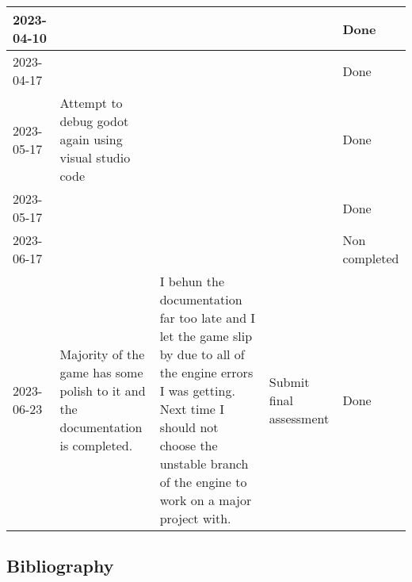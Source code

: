 \documentclass[12pt, DIV=calc]{scrartcl}
\newenvironment{alscape}[1]%
{%
    \begin{landscape}
}%
{%
    \end{landscape}
}
\begin{document}
\begin{alscape}{DIV=8}
\begin{xltabular}[c]{\textwidth}{|X|X|X|X|X|}
2023-04-10 & & & & Done \\ \hline

2023-04-17 & & & & Done \\ \hline

2023-05-17 & Attempt to debug godot again using visual studio code & & & Done \\ \hline

2023-05-17 &  & & & Done \\ \hline

2023-06-17 & & & & Non completed \\ \hline

2023-06-23 & Majority of the game has some polish to it and the documentation is completed.  & I behun the documentation far too late and I let the game slip by due to all of the engine errors I was getting. Next time I should not choose the unstable branch of the engine to work on a major project with. & Submit final assessment & Done \\ \hline




\end{xltabular}
\end{alscape}


\subsection{Bibliography}
\end{document}
